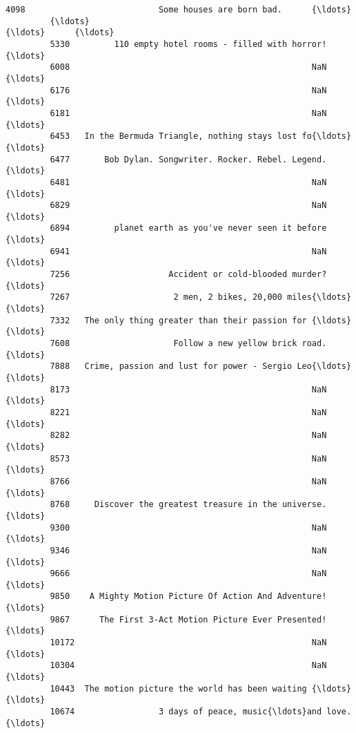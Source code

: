\documentclass[11pt]{article}
\begin{document}
\begin{Verbatim}[commandchars=\\\{\}]
         4098                           Some houses are born bad.      {\ldots}        
         {\ldots}                                                  {\ldots}      {\ldots}        
         5330         110 empty hotel rooms - filled with horror!      {\ldots}        
         6008                                                 NaN      {\ldots}        
         6176                                                 NaN      {\ldots}        
         6181                                                 NaN      {\ldots}        
         6453   In the Bermuda Triangle, nothing stays lost fo{\ldots}      {\ldots}        
         6477       Bob Dylan. Songwriter. Rocker. Rebel. Legend.      {\ldots}        
         6481                                                 NaN      {\ldots}        
         6829                                                 NaN      {\ldots}        
         6894         planet earth as you've never seen it before      {\ldots}        
         6941                                                 NaN      {\ldots}        
         7256                    Accident or cold-blooded murder?      {\ldots}        
         7267                     2 men, 2 bikes, 20,000 miles{\ldots}      {\ldots}        
         7332   The only thing greater than their passion for {\ldots}      {\ldots}        
         7608                     Follow a new yellow brick road.      {\ldots}        
         7888   Crime, passion and lust for power - Sergio Leo{\ldots}      {\ldots}        
         8173                                                 NaN      {\ldots}        
         8221                                                 NaN      {\ldots}        
         8282                                                 NaN      {\ldots}        
         8573                                                 NaN      {\ldots}        
         8766                                                 NaN      {\ldots}        
         8768     Discover the greatest treasure in the universe.      {\ldots}        
         9300                                                 NaN      {\ldots}        
         9346                                                 NaN      {\ldots}        
         9666                                                 NaN      {\ldots}        
         9850    A Mighty Motion Picture Of Action And Adventure!      {\ldots}        
         9867      The First 3-Act Motion Picture Ever Presented!      {\ldots}        
         10172                                                NaN      {\ldots}        
         10304                                                NaN      {\ldots}        
         10443  The motion picture the world has been waiting {\ldots}      {\ldots}        
         10674                 3 days of peace, music{\ldots}and love.      {\ldots}        
         

\end{Verbatim}
\end{document}
